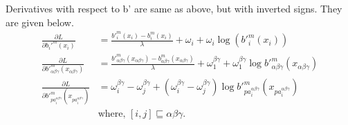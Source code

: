 \documentclass{article}
\begin{document}
Derivatives with respect to b' are same as above, but with inverted signs. They are given below.
\begin{align*}
\frac{\partial L}{\partial b_i'^m(x_i)}&=\frac{b'^m_i(x_i)-b^m_i(x_i)}{\lambda} + \omega_i + \omega_i\log\left(b'^m_i(x_i)\right)\\
\frac{\partial L}{\partial b'^m_{\alpha\beta\gamma}(x_{\alpha\beta\gamma})}&=\frac{b'^m_{\alpha\beta\gamma}(x_{\alpha\beta\gamma})-b^m_{\alpha\beta\gamma}(x_{\alpha\beta\gamma})}{\lambda} + \omega_1^{\beta\gamma}+ \omega_1^{\beta\gamma}\log b'^m_{\alpha\beta\gamma}(x_{\alpha\beta\gamma})\\
\frac{\partial L}{\partial b'^m_{pa_i^{\alpha\beta\gamma}}(x_{pa_i^{\alpha\beta\gamma}})}&=\omega_i^{\beta\gamma}-\omega_j^{\beta\gamma} + (\omega_i^{\beta\gamma}-\omega_j^{\beta\gamma})\log b'^m_{pa_i^{\alpha\beta\gamma}}(x_{pa_i^{\alpha\beta\gamma}})\\
&\text{where, $[i,j]\sqsubseteq \alpha\beta\gamma$.}
\end{align*}



\end{document}
